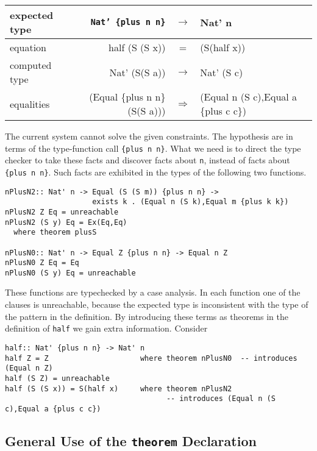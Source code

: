 \documentclass[11pt,twoside]{article}
\newcommand{\plus}[2]{\{plus {#1} {#2}\}}
\begin{document}
\vspace*{.1in}
\begin{tabular}{|l|rcl|} \hline
{\small expected type} & {\small{\tt Nat' \plus{n}{n}}} & $\rightarrow$ & {\small Nat' n} \\ \hline
{\small equation} & {\small half (S (S x))} & =             & {\small (S(half x))} \\ \hline
{\small computed type} & {\small Nat' (S(S a))} & $\rightarrow$ & {\small Nat' (S c)} \\ \hline
{\small equalities}    & {\small (Equal \plus{n}{n} (S(S a)))} & $\Rightarrow$ & {\small (Equal n (S c),Equal a \plus{c}{c})} \\ \hline
\end{tabular}
\vspace*{.1in}

The current system cannot solve the given constraints.  The hypothesis are in terms
of the type-function call \verb+{plus n n}+. What we need is to direct
the type checker to take these facts and discover facts about \verb+n+, instead
of facts about \verb+{plus n n}+. Such facts are exhibited in the types of the following
two functions.

\begin{verbatim}
nPlusN2:: Nat' n -> Equal (S (S m)) {plus n n} ->
                    exists k . (Equal n (S k),Equal m {plus k k})
nPlusN2 Z Eq = unreachable
nPlusN2 (S y) Eq = Ex(Eq,Eq)
  where theorem plusS

nPlusN0:: Nat' n -> Equal Z {plus n n} -> Equal n Z
nPlusN0 Z Eq = Eq
nPlusN0 (S y) Eq = unreachable
\end{verbatim}

These functions are typechecked by a case analysis. In each
function one of the clauses is unreachable, because the expected type is inconsistent
with the type of the pattern in the definition. By introducing these
terms as theorems in the definition of {\tt half} we gain extra information.
Consider

\begin{verbatim}
half:: Nat' {plus n n} -> Nat' n
half Z = Z                     where theorem nPlusN0  -- introduces (Equal n Z)
half (S Z) = unreachable
half (S (S x)) = S(half x)     where theorem nPlusN2
                                     -- introduces (Equal n (S c),Equal a {plus c c})
\end{verbatim}

\subsection{General Use of the {\tt theorem} Declaration}
\end{document}
